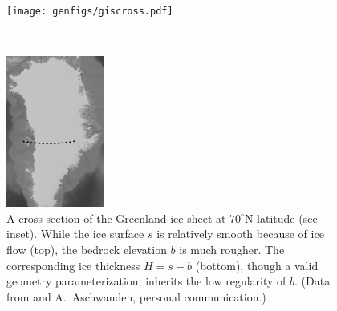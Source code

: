 \documentclass[hidelinks,onefignum,onetabnum,final]{siamart220329}  %
\begin{document}
\begin{figure}
\begin{minipage}[t]{0.85\textwidth}
\vspace{0pt}
\texttt{[image: genfigs/giscross.pdf]}
\end{minipage}
\,
\begin{minipage}[t]{0.13\textwidth}
\vspace{10pt}
\includegraphics[width=\textwidth]{genfigs/gis/gris-profile-gray.png}
\end{minipage}
\caption{A cross-section of the Greenland ice sheet at $70^\circ$N latitude (see inset).  While the ice surface $s$ is relatively smooth because of ice flow (top), the bedrock elevation $b$ is much rougher.  The corresponding ice thickness $H = s-b$ (bottom), though a valid geometry parameterization, inherits the low regularity of $b$.  (Data from \cite{Morlighemetal2017} and A.~Aschwanden, personal communication.)}
\label{fig:giscross}
\end{figure}
\end{document}
